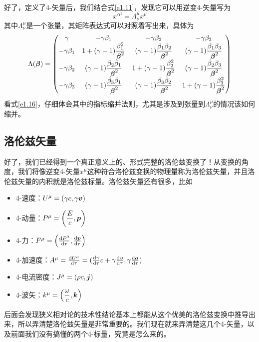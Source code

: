 \documentclass[12pt, a4paper, oneside]{ctexbook}
\begin{document}
好了，定义了4-矢量后，我们结合式\eqref{e1.11}，发现它可以用逆变4-矢量写为
\begin{equation}\label{e1.16}
	x'^{\mu}=\Lambda^{\mu}_{\nu}x^{\nu}
\end{equation}
其中$\Lambda^{\mu}_{\nu}$是一个张量，其矩阵表达式可以对照着写出来，具体为
\begin{equation}
	\Lambda(\vb*{\beta})=\begin{pmatrix}
		\gamma & -\gamma\beta_{1} & -\gamma\beta_{2} & -\gamma\beta_{3} \\
		-\gamma\beta_{1} & 1+(\gamma-1)\dfrac{\beta_{1}^{2}}{\vb*{\beta}^{2}} & (\gamma-1)\dfrac{\beta_{1}\beta_{2}}{\vb*{\beta}^{2}} & (\gamma-1)\dfrac{\beta_{1}\beta_{3}}{\vb*{\beta}^{2}} \\
		-\gamma\beta_{2} & (\gamma-1)\dfrac{\beta_{2}\beta_{1}}{\vb*{\beta}^{2}} & 1+(\gamma-1)\dfrac{\beta_{2}^{2}}{\vb*{\beta}^{2}} & (\gamma-1)\dfrac{\beta_{2}\beta_{3}}{\vb*{\beta}^{2}} \\
		-\gamma\beta_{3} & (\gamma-1)\dfrac{\beta_{3}\beta_{1}}{\vb*{\beta}^{2}} & (\gamma-1)\dfrac{\beta_{3}\beta_{2}}{\vb*{\beta}^{2}} & 1+(\gamma-1)\dfrac{\beta_{3}^{2}}{\vb*{\beta}^{2}}
	\end{pmatrix}
\end{equation}
看式\eqref{e1.16}，仔细体会其中的指标缩并法则，尤其是涉及到张量到$\Lambda_{\nu}^{\mu}$的情况该如何缩并。\par 

\subsection{洛伦兹矢量}

好了，我们已经得到一个真正意义上的、形式完整的洛伦兹变换了！从变换的角度，我们将像逆变4-矢量$x^{\mu}$这种符合洛伦兹变换的物理量称为洛伦兹矢量，并且洛伦兹矢量的内积就是洛伦兹标量。洛伦兹矢量还有很多，比如
\begin{itemize}
	\item 4-速度：$U^{\mu}=(\gamma c,\gamma\vb*{v})$
	\item 4-动量：$P^{\mu}=\qty(\dfrac{E}{c},\vb*{p})$
	\item 4-力：$F^{\mu}=\qty(\dv{P^{0}}{\tau},\dv{\vb*{p}}{\tau})$
	\item 4-加速度：$A^{\mu}=\dv{U^{\mu}}{\tau}=(\dv{\gamma}{\tau}c+\gamma\dv{\vb*{v}}{\tau},\gamma\dv{\vb*{a}}{\tau})$
	\item 4-电流密度：$J^{\mu}=(\rho c,\vb*{j})$
	\item 4-波矢：$k^{\mu}=\qty(\dfrac{\omega}{c},\vb*{k})$
\end{itemize}
后面会发现狭义相对论的技术性结论基本上都能从这个优美的洛伦兹变换中推导出来，所以弄清楚洛伦兹矢量是非常重要的。我们现在就来弄清楚这几个4-矢量，以及前面我们没有搞懂的两个4-标量，究竟是怎么来的。
\end{document}

